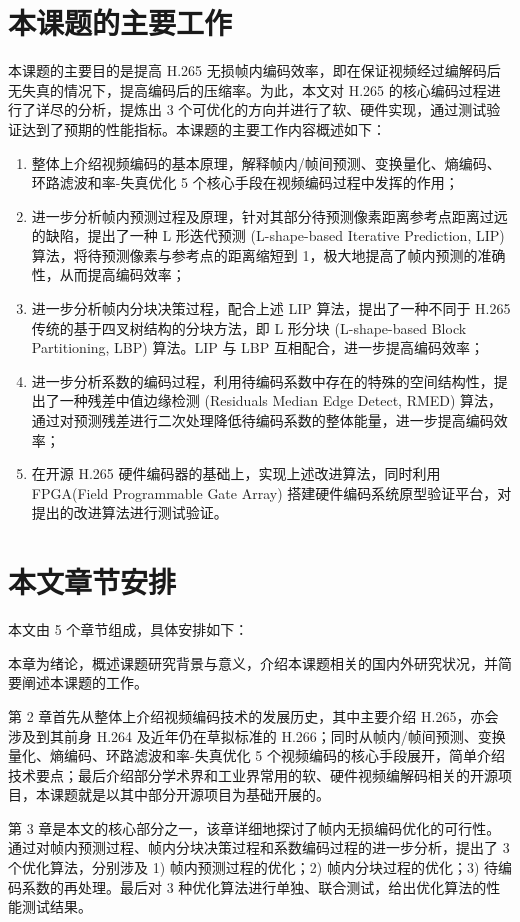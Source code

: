 \section{本课题的主要工作}
本课题的主要目的是提高 H.265 无损帧内编码效率，即在保证视频经过编解码后无失真的情况下，提高编码后的压缩率。为此，本文对 H.265 的核心编码过程进行了详尽的分析，提炼出 3 个可优化的方向并进行了软、硬件实现，通过测试验证达到了预期的性能指标。本课题的主要工作内容概述如下：
\begin{enumerate}
    \item 整体上介绍视频编码的基本原理，解释帧内/帧间预测、变换量化、熵编码、环路滤波和率-失真优化 5 个核心手段在视频编码过程中发挥的作用；
    \item 进一步分析帧内预测过程及原理，针对其部分待预测像素距离参考点距离过远的缺陷，提出了一种 L 形迭代预测 (L-shape-based Iterative Prediction, LIP) 算法，将待预测像素与参考点的距离缩短到 1，极大地提高了帧内预测的准确性，从而提高编码效率；
    \item 进一步分析帧内分块决策过程，配合上述 LIP 算法，提出了一种不同于 H.265 传统的基于四叉树结构的分块方法，即 L 形分块 (L-shape-based Block Partitioning, LBP) 算法。LIP 与 LBP 互相配合，进一步提高编码效率；
    \item 进一步分析系数的编码过程，利用待编码系数中存在的特殊的空间结构性，提出了一种残差中值边缘检测 (Residuals Median Edge Detect, RMED) 算法，通过对预测残差进行二次处理降低待编码系数的整体能量，进一步提高编码效率；
    \item 在开源 H.265 硬件编码器的基础上，实现上述改进算法，同时利用 FPGA(Field Programmable Gate Array) 搭建硬件编码系统原型验证平台，对提出的改进算法进行测试验证。
\end{enumerate}

\section{本文章节安排}
本文由 5 个章节组成，具体安排如下：

本章为绪论，概述课题研究背景与意义，介绍本课题相关的国内外研究状况，并简要阐述本课题的工作。

第 2 章首先从整体上介绍视频编码技术的发展历史，其中主要介绍 H.265，亦会涉及到其前身 H.264 及近年仍在草拟标准的 H.266；同时从帧内/帧间预测、变换量化、熵编码、环路滤波和率-失真优化 5 个视频编码的核心手段展开，简单介绍技术要点；最后介绍部分学术界和工业界常用的软、硬件视频编解码相关的开源项目，本课题就是以其中部分开源项目为基础开展的。

第 3 章是本文的核心部分之一，该章详细地探讨了帧内无损编码优化的可行性。通过对帧内预测过程、帧内分块决策过程和系数编码过程的进一步分析，提出了 3 个优化算法，分别涉及 1) 帧内预测过程的优化；2) 帧内分块过程的优化；3) 待编码系数的再处理。最后对 3 种优化算法进行单独、联合测试，给出优化算法的性能测试结果。

